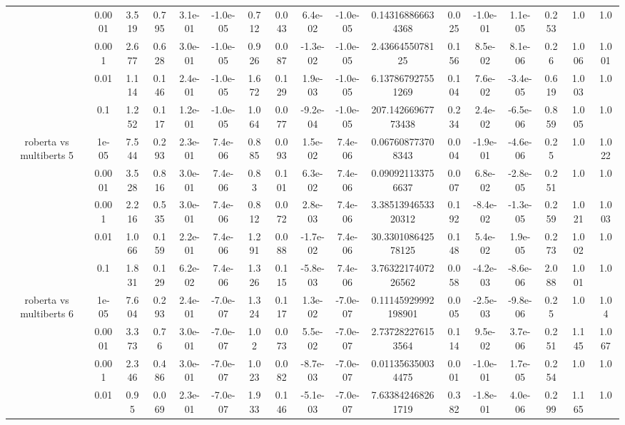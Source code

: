 \begin{tabular}{|c|c|c|c|c|c|c|c|c|c|c|c|c|c|c|c|c|}
 & 0.0001 & 3.519 & 0.795 & 3.1e-01 & -1.0e-05 & 0.712 & 0.043 & 6.4e-02 & -1.0e-05 & 0.143168866634368 & 0.025 & -1.0e-01 & 1.1e-05 & 0.253 & 1.0 & 1.0 \\
 & 0.001 & 2.677 & 0.628 & 3.0e-01 & -1.0e-05 & 0.926 & 0.087 & -1.3e-02 & -1.0e-05 & 2.4366455078125 & 0.156 & 8.5e-02 & 8.1e-06 & 0.26 & 1.006 & 1.001 \\
 & 0.01 & 1.114 & 0.146 & 2.4e-01 & -1.0e-05 & 1.672 & 0.129 & 1.9e-03 & -1.0e-05 & 6.137867927551269 & 0.104 & 7.6e-02 & -3.4e-05 & 0.619 & 1.003 & 1.0 \\
 & 0.1 & 1.252 & 0.117 & 1.2e-01 & -1.0e-05 & 1.064 & 0.077 & -9.2e-04 & -1.0e-05 & 207.14266967773438 & 0.234 & 2.4e-02 & -6.5e-06 & 0.859 & 1.005 & 1.0 \\
\hline
\multirow{5}{*}{roberta  vs multiberts 5} & 1e-05 & 7.544 & 0.293 & 2.3e-01 & 7.4e-06 & 0.885 & 0.093 & 1.5e-02 & 7.4e-06 & 0.067608773708343 & 0.004 & -1.9e-01 & -4.6e-06 & 0.25 & 1.0 & 1.022 \\
 & 0.0001 & 3.528 & 0.816 & 3.0e-01 & 7.4e-06 & 0.83 & 0.101 & 6.3e-02 & 7.4e-06 & 0.090921133756637 & 0.007 & 6.8e-02 & -2.8e-05 & 0.251 & 1.0 & 1.0 \\
 & 0.001 & 2.216 & 0.535 & 3.0e-01 & 7.4e-06 & 0.812 & 0.072 & 2.8e-03 & 7.4e-06 & 3.3851394653320312 & 0.192 & -8.4e-02 & -1.3e-05 & 0.259 & 1.021 & 1.003 \\
 & 0.01 & 1.066 & 0.159 & 2.2e-01 & 7.4e-06 & 1.291 & 0.088 & -1.7e-02 & 7.4e-06 & 30.330108642578125 & 0.148 & 5.4e-02 & 1.9e-05 & 0.273 & 1.002 & 1.0 \\
 & 0.1 & 1.831 & 0.129 & 6.2e-02 & 7.4e-06 & 1.326 & 0.115 & -5.8e-03 & 7.4e-06 & 3.7632217407226562 & 0.058 & -4.2e-03 & -8.6e-06 & 2.088 & 1.001 & 1.0 \\
\hline
\multirow{5}{*}{roberta  vs multiberts 6} & 1e-05 & 7.604 & 0.293 & 2.4e-01 & -7.0e-07 & 1.324 & 0.117 & 1.3e-02 & -7.0e-07 & 0.11145929992198901 & 0.005 & -2.5e-03 & -9.8e-06 & 0.25 & 1.0 & 1.04 \\
 & 0.0001 & 3.373 & 0.76 & 3.0e-01 & -7.0e-07 & 1.02 & 0.073 & 5.5e-02 & -7.0e-07 & 2.737282276153564 & 0.114 & 9.5e-02 & 3.7e-06 & 0.251 & 1.145 & 1.067 \\
 & 0.001 & 2.346 & 0.486 & 3.0e-01 & -7.0e-07 & 1.023 & 0.082 & -8.7e-03 & -7.0e-07 & 0.011356350034475 & 0.001 & -1.0e-01 & 1.7e-05 & 0.254 & 1.0 & 1.0 \\
 & 0.01 & 0.95 & 0.069 & 2.3e-01 & -7.0e-07 & 1.933 & 0.146 & -5.1e-03 & -7.0e-07 & 7.633842468261719 & 0.382 & -1.8e-01 & 4.0e-06 & 0.299 & 1.165 & 1.0 \\

\end{tabular}
